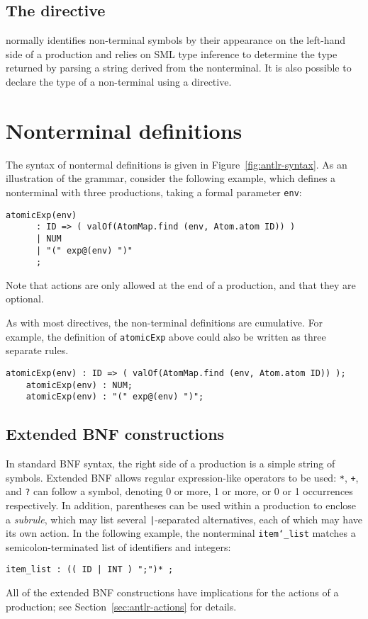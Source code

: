 \subsection{The  directive}
\mlantlr{} normally identifies non-terminal symbols by their appearance on the left-hand side
of a production and relies on SML type inference to determine the type returned by parsing
a string derived from the nonterminal.
It is also possible to declare the type of a non-terminal using a  directive.

\section{Nonterminal definitions}\label{sec:antlr-nt}

The syntax of nontermal definitions is given in Figure~\ref{fig:antlr-syntax}.  As an illustration of the grammar, consider the following example, which defines a nonterminal with three productions, taking a formal parameter \texttt{env}:
\begin{lstlisting}[language=MLAntlr]
    atomicExp(env)
      : ID => ( valOf(AtomMap.find (env, Atom.atom ID)) )
      | NUM
      | "(" exp@(env) ")"
      ;
\end{lstlisting}%
Note that actions are only allowed at the end of a production, and that they are optional.

As with most directives, the non-terminal definitions are cumulative.
For example, the definition of \texttt{atomicExp} above could also be
written as three separate rules.
\begin{lstlisting}[language=MLAntlr]
    atomicExp(env) : ID => ( valOf(AtomMap.find (env, Atom.atom ID)) );
    atomicExp(env) : NUM;
    atomicExp(env) : "(" exp@(env) ")";
\end{lstlisting}%

\subsection{Extended BNF constructions}

In standard BNF syntax, the right side of a production is a simple string of symbols.  Extended BNF allows regular expression-like operators to be used: \texttt{*}, \texttt{+}, and \texttt{?} can follow a symbol, denoting 0 or more, 1 or more, or 0 or 1 occurrences respectively.  In addition, parentheses can be used within a production to enclose a \emph{subrule}, which may list several \texttt{|}-separated alternatives, each of which may have its own action.  In the following example, the nonterminal \texttt{item\char`\_list} matches a semicolon-terminated list of identifiers and integers:
\begin{lstlisting}[language=MLAntlr]
    item_list : (( ID | INT ) ";")* ;
\end{lstlisting}%
All of the extended BNF constructions have implications for the actions of a production; see Section~\ref{sec:antlr-actions} for details.

